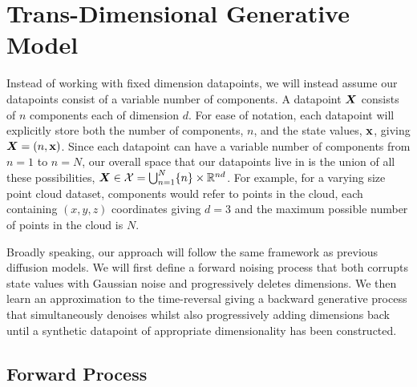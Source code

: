 \section{Trans-Dimensional Generative Model}
Instead of working with fixed dimension datapoints, we will instead assume our datapoints consist of a variable number of components. A datapoint ${\bm{X}}$ consists of $n$ components each of dimension $d$. For ease of notation, each datapoint will explicitly store both the number of components, $n$, and the state values, ${\mathbf{x}}$, giving ${\bm{X}} = (n, {\mathbf{x}})$. Since each datapoint can have a variable number of components from $n=1$ to $n=N$, our overall space that our datapoints live in is the union of all these possibilities, ${\bm{X}} \in {\mathcal{X}} = \bigcup_{n=1}^N \{n \} \times \mathbb{R}^{nd}$. For example, for a varying size point cloud dataset, components would refer to points in the cloud, each containing $(x,y,z)$ coordinates giving $d=3$ and the maximum possible number of points in the cloud is $N$.

Broadly speaking, our approach will follow the same framework as previous diffusion models. We will first define a forward noising process that both corrupts state values with Gaussian noise and progressively deletes dimensions.
We then learn an approximation to the time-reversal giving a backward generative process that simultaneously denoises whilst also progressively adding dimensions back until a synthetic datapoint of appropriate dimensionality has been constructed.

\subsection{Forward Process}
\label{sec:jump-diff-proc}

